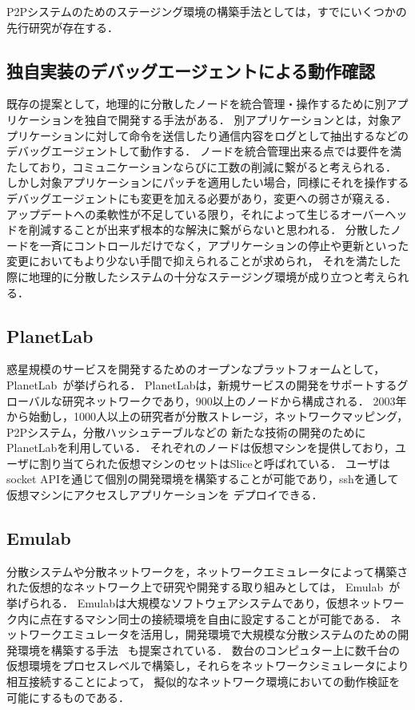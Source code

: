 P2Pシステムのためのステージング環境の構築手法としては，すでにいくつかの先行研究が存在する．

\subsection{独自実装のデバッグエージェントによる動作確認}

既存の提案として，地理的に分散したノードを統合管理・操作するために別アプリケーションを独自で開発する手法がある．
別アプリケーションとは，対象アプリケーションに対して命令を送信したり通信内容をログとして抽出するなどのデバッグエージェントして動作する．
ノードを統合管理出来る点では要件を満たしており，コミュニケーションならびに工数の削減に繋がると考えられる．
しかし対象アプリケーションにパッチを適用したい場合，同様にそれを操作するデバッグエージェントにも変更を加える必要があり，変更への弱さが窺える．
アップデートへの柔軟性が不足している限り，それによって生じるオーバーヘッドを削減することが出来ず根本的な解決に繋がらないと思われる．
分散したノードを一斉にコントロールだけでなく，アプリケーションの停止や更新といった変更においてもより少ない手間で抑えられることが求められ，
それを満たした際に地理的に分散したシステムの十分なステージング環境が成り立つと考えられる．

\subsection{PlanetLab}
\label{consideration:related-works:planetlab}

惑星規模のサービスを開発するためのオープンなプラットフォームとして，PlanetLab~\cite{PlanetLab}が挙げられる．
PlanetLabは，新規サービスの開発をサポートするグローバルな研究ネットワークであり，900以上のノードから構成される．
2003年から始動し，1000人以上の研究者が分散ストレージ，ネットワークマッピング，P2Pシステム，分散ハッシュテーブルなどの
新たな技術の開発のためにPlanetLabを利用している．
それぞれのノードは仮想マシンを提供しており，ユーザに割り当てられた仮想マシンのセットはSliceと呼ばれている．
ユーザはsocket APIを通じて個別の開発環境を構築することが可能であり，sshを通して仮想マシンにアクセスしアプリケーションを
デプロイできる．

\subsection{Emulab}
\label{consideration:related-works:emulab}

分散システムや分散ネットワークを，ネットワークエミュレータによって構築された仮想的なネットワーク上で研究や開発する取り組みとしては，
Emulab~\cite{Emulab}が挙げられる．
Emulabは大規模なソフトウェアシステムであり，仮想ネットワーク内に点在するマシン同士の接続環境を自由に設定することが可能である．
ネットワークエミュレータを活用し，開発環境で大規模な分散システムのための開発環境を構築する手法
~\cite{RelatedWork1}も提案されている．
数台のコンピュター上に数千台の仮想環境をプロセスレベルで構築し，それらをネットワークシミュレータにより相互接続することによって，
擬似的なネットワーク環境においての動作検証を可能にするものである．

